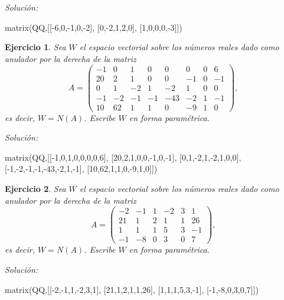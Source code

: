 \documentclass{amsart}
\newtheorem{ejer}{Ejercicio}
\begin{document}
{\it Soluci\'on:}

\begin{sageblock}
matrix(QQ,[[-6,0,-1,0,-2],
[0,-2,1,2,0],
[1,0,0,0,-3]])
\end{sageblock}



\begin{ejer} Sea $W$ el espacio vectorial sobre los números reales dado
como anulador por la derecha de la matriz 
\[A = \left(\begin{array}{rrrrrrrr}
-1 & 0 & 1 & 0 & 0 & 0 & 0 & 6 \\
20 & 2 & 1 & 0 & 0 & -1 & 0 & -1 \\
0 & 1 & -2 & 1 & -2 & 1 & 0 & 0 \\
-1 & -2 & -1 & -1 & -43 & -2 & 1 & -1 \\
10 & 62 & 1 & 1 & 0 & -9 & 1 & 0
\end{array}\right),\]
es decir, $W = N(A)$. Escribe $W$ en forma param\'etrica.
\end{ejer}

{\it Soluci\'on:}

\begin{sageblock}
matrix(QQ,[[-1,0,1,0,0,0,0,6],
[20,2,1,0,0,-1,0,-1],
[0,1,-2,1,-2,1,0,0],
[-1,-2,-1,-1,-43,-2,1,-1],
[10,62,1,1,0,-9,1,0]])
\end{sageblock}



\begin{ejer} Sea $W$ el espacio vectorial sobre los números reales dado
como anulador por la derecha de la matriz 
\[A = \left(\begin{array}{rrrrrr}
-2 & -1 & 1 & -2 & 3 & 1 \\
21 & 1 & 2 & 1 & 1 & 26 \\
1 & 1 & 1 & 5 & 3 & -1 \\
-1 & -8 & 0 & 3 & 0 & 7
\end{array}\right),\]
es decir, $W = N(A)$. Escribe $W$ en forma param\'etrica.
\end{ejer}

{\it Soluci\'on:}

\begin{sageblock}
matrix(QQ,[[-2,-1,1,-2,3,1],
[21,1,2,1,1,26],
[1,1,1,5,3,-1],
[-1,-8,0,3,0,7]])
\end{sageblock}
\end{document}

